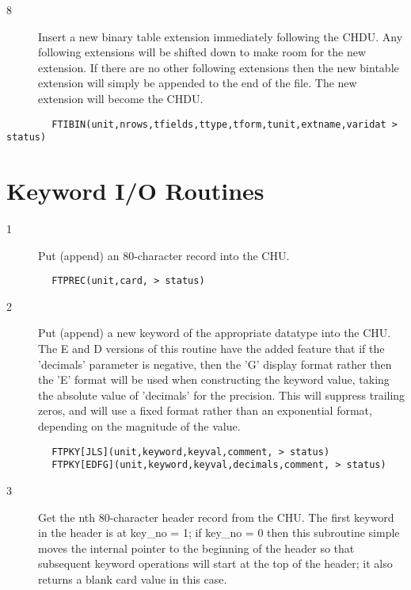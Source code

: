 \documentclass[11pt]{book}
\begin{document}
\begin{description}
\item[8 ] Insert a new binary table extension immediately following the CHDU.
    Any following extensions will be shifted down to make room for
    the new extension.  If there are no other following extensions
    then the new bintable extension will simply be appended to the
   end of the file.  The new extension will become the CHDU.
\end{description}

\begin{verbatim}
        FTIBIN(unit,nrows,tfields,ttype,tform,tunit,extname,varidat > status)
\end{verbatim}

\section{Keyword I/O Routines}


\begin{description}
\item[1 ]Put (append) an 80-character record into the CHU.
\end{description}

\begin{verbatim}
        FTPREC(unit,card, > status)
\end{verbatim}

\begin{description}
\item[2 ] Put (append) a new keyword of the appropriate datatype into the CHU.
     The E and D versions of this routine have the added feature that
     if the 'decimals' parameter is negative, then the 'G' display
     format rather then the 'E' format will be used when constructing
     the keyword value, taking the absolute value of 'decimals' for the
     precision.  This will suppress trailing zeros, and will use a
     fixed format rather than an exponential format,
    depending on the magnitude of the value.
\end{description}

\begin{verbatim}
        FTPKY[JLS](unit,keyword,keyval,comment, > status)
        FTPKY[EDFG](unit,keyword,keyval,decimals,comment, > status)
\end{verbatim}

\begin{description}
\item[3 ]Get the nth 80-character header record from the CHU.  The first keyword
   in the header is at key\_no = 1;  if key\_no = 0 then this subroutine
   simple moves the internal pointer to the beginning of the header
   so that subsequent keyword operations will start at the top of
  the header; it also returns a blank card value in this case.
\end{description}
\end{document}
